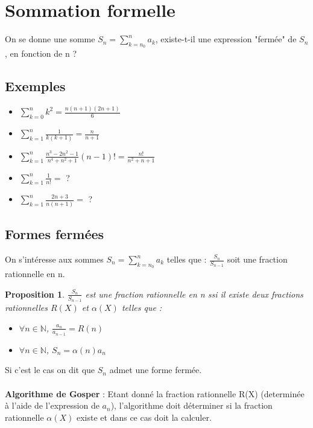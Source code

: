 \documentclass[17 pt,french]{scrartcl}
\newtheorem{prop}{Proposition}
\begin{document}
	\section*{Sommation formelle}
	
	On se donne une somme $S_n = \sum_{k=n_0}^n {a_k} $, existe-t-il une expression "fermée" de $S_n$, en fonction de n ?
	
    \subsection*{Exemples}
    	\begin{itemize}
    		\item $\sum_{k=0}^n k^2 = \frac{n(n+1)(2n+1)}{6}$\\
    		
		\item $\sum_{k=1}^n \frac{1}{k(k+1)} = \frac{n}{n+1}$\\
			
		\item $ \sum_{k=1}^n {\frac{n^3-2n^2-1}{n^4+n^2+1}(n-1)!} = \frac{n!}{n^2+n+1}$\\
		
		\item $ \sum_{k=1}^n {\frac{1}{n!}} = $ ? \\
		\item $ \sum_{k=1}^n {\frac{2n+3}{n(n+1)}} = $ ? \\
	\end{itemize}
	
	\subsection*{Formes fermées}
	On s'intéresse aux sommes  $S_n = \sum_{k=n_0}^n {a_k} $ telles que : $\frac{S_n}{S_{n-1}}$ soit une fraction rationnelle en n.
	
	\begin{prop}
	 $\frac{S_n}{S_{n-1}}$ est une fraction rationnelle en n ssi il existe deux fractions rationnelles $R(X)$ et $\alpha(X)$ telles que : 
	 \begin{itemize}
	 \item $\forall n \in \mathbb{N}$, $\frac{a_n}{a_{n-1}} = R(n)$
	 \item $\forall n \in \mathbb{N}$, $S_n = \alpha(n)a_n$
	 \end{itemize}
	\end{prop}

	Si c'est le cas on dit que $S_n$ admet une forme fermée.\\ \\
	\textbf{Algorithme de Gosper} :
		Etant donné la fraction rationnelle R(X) (determinée à l'aide de l'expression de $a_n$), l'algorithme doit déterminer si la fraction rationnelle $\alpha(X)$ existe et dans ce cas doit la calculer.
		\newpage
\end{document}
